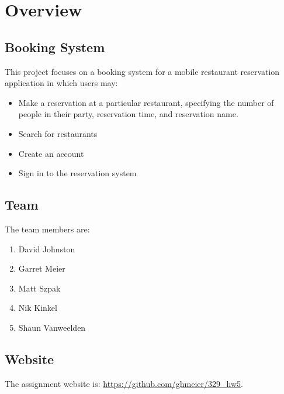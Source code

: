 \chapter{Overview}

\section{Booking System}

This project focuses on a booking system for a mobile restaurant reservation 
application in which users may:

\begin{itemize}
    \item Make a reservation at a particular restaurant, specifying the number
          of people in their party, reservation time, and reservation name.
    \item Search for restaurants
    \item Create an account
    \item Sign in to the reservation system
\end{itemize}

\section{Team}

The team members are:

\begin{enumerate}
    \item David Johnston
    \item Garret Meier
    \item Matt Szpak
    \item Nik Kinkel
    \item Shaun Vanweelden
\end{enumerate}

\section{Website}

The assignment website is: \url{https://github.com/ghmeier/329_hw5}.
